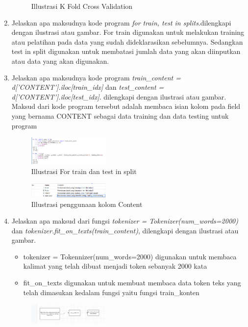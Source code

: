 \begin{enumerate}
\begin{figure}[H]
    \centering
    \caption{Illustrasi K Fold Cross Validation}
\end{figure}
\item
Jelaskan apa maksudnya kode program \emph{for train, test in splits}.dilengkapi dengan ilustrasi atau gambar.
For train digunakan untuk melakukan training atau pelatihan pada data yang sudah dideklarasikan sebelumnya. Sedangkan test in split digunakan untuk membatasi jumlah data yang akan diinputkan atau data yang akan digunakan.
\item
Jelaskan apa maksudnya kode program \emph{train\_content = d['CONTENT'].iloc[train\_idx]} dan \emph{test\_content = d['CONTENT'].iloc[test\_idx]}. dilengkapi dengan ilustrasi atau gambar.
Maksud dari kode program tersebut adalah membaca isian kolom pada ﬁeld yang bernama CONTENT sebagai data training dan data testing untuk program 
\begin{figure}[H]
    \includegraphics[width=4cm]{figures/1174035/chapter7/teori_3.png}
    \centering
    \caption{Illustrasi For train dan test in split}
\end{figure}
\begin{figure}[H]
    \includegraphics[width=4cm]{figures/1174035/chapter7/teori_4.png}
    \centering
    \caption{Illustrasi penggunaan kolom Content}
\end{figure}
\item
Jelaskan apa maksud dari fungsi \emph{tokenizer = Tokenizer(num\_words=2000)} dan \emph{tokenizer.fit\_on\_texts(train\_content)}, dilengkapi dengan ilustrasi atau gambar.
\begin{itemize}
    \item tokenizer = Tokennizer(num\_words=2000) digunakan untuk membaca kalimat yang telah dibuat menjadi token sebanyak 2000 kata
    \item fit\_on\_texts digunakan untuk membuat membaca data token teks yang telah dimasukan kedalam fungsi yaitu fungsi train\_konten
\end{itemize}
\begin{figure}[H]
    \includegraphics[width=4cm]{figures/1174035/chapter7/teori_5.png}

\end{figure}
\end{enumerate}
